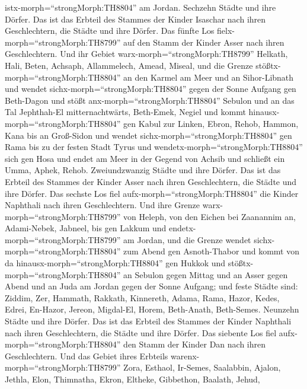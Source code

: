 istx-morph=``strongMorph:TH8804'' am Jordan. Sechzehn Städte und ihre
Dörfer.  Das ist das Erbteil des Stammes der Kinder
Isaschar nach ihren Geschlechtern, die Städte und ihre Dörfer.
 Das fünfte Los fielx-morph=``strongMorph:TH8799'' auf den
Stamm der Kinder Asser nach ihren Geschlechtern.  Und ihr
Gebiet warx-morph=``strongMorph:TH8799'' Helkath, Hali, Beten, Achsaph,
 Allammelech, Amead, Miseal, und die Grenze
stößtx-morph=``strongMorph:TH8804'' an den Karmel am Meer und an
Sihor-Libnath  und wendet
sichx-morph=``strongMorph:TH8804'' gegen der Sonne Aufgang gen
Beth-Dagon und stößt anx-morph=``strongMorph:TH8804'' Sebulon und an das
Tal Jephthah-El mitternachtwärts, Beth-Emek, Negiel und kommt
hinausx-morph=``strongMorph:TH8804'' gen Kabul zur Linken, 
Ebron, Rehob, Hammon, Kana bis an Groß-Sidon  und wendet
sichx-morph=``strongMorph:TH8804'' gen Rama bis zu der festen Stadt
Tyrus und wendetx-morph=``strongMorph:TH8804'' sich gen Hosa und endet
am Meer in der Gegend von Achsib  und schließt ein Umma,
Aphek, Rehob. Zweiundzwanzig Städte und ihre Dörfer.  Das
ist das Erbteil des Stammes der Kinder Asser nach ihren Geschlechtern,
die Städte und ihre Dörfer.  Das sechste Los fiel
aufx-morph=``strongMorph:TH8804'' die Kinder Naphthali nach ihren
Geschlechtern.  Und ihre Grenze
warx-morph=``strongMorph:TH8799'' von Heleph, von den Eichen bei
Zaanannim an, Adami-Nebek, Jabneel, bis gen Lakkum und
endetx-morph=``strongMorph:TH8799'' am Jordan,  und die
Grenze wendet sichx-morph=``strongMorph:TH8804'' zum Abend gen
Asnoth-Thabor und kommt von da hinausx-morph=``strongMorph:TH8804'' gen
Hukkok und stößtx-morph=``strongMorph:TH8804'' an Sebulon gegen Mittag
und an Asser gegen Abend und an Juda am Jordan gegen der Sonne Aufgang;
 und feste Städte sind: Ziddim, Zer, Hammath, Rakkath,
Kinnereth,  Adama, Rama, Hazor,  Kedes, Edrei,
En-Hazor,  Jereon, Migdal-El, Horem, Beth-Anath,
Beth-Semes. Neunzehn Städte und ihre Dörfer.  Das ist das
Erbteil des Stammes der Kinder Naphthali nach ihren Geschlechtern, die
Städte und ihre Dörfer.  Das siebente Los fiel
aufx-morph=``strongMorph:TH8804'' den Stamm der Kinder Dan nach ihren
Geschlechtern.  Und das Gebiet ihres Erbteils
warenx-morph=``strongMorph:TH8799'' Zora, Esthaol, Ir-Semes,
 Saalabbin, Ajalon, Jethla,  Elon, Thimnatha,
Ekron,  Eltheke, Gibbethon, Baalath,  Jehud,
